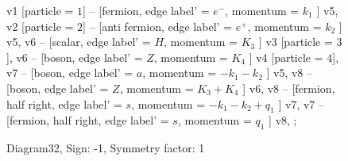 \documentclass{revtex4}
\begin{document}
\begin{figure}[!htb]
\begin{center}
{    %
v1 [particle = \(1\)] -- [fermion, edge label' = \(e^{-}\), momentum = \(k_{1}\) ] v5, 
v2 [particle = \(2\)] -- [anti fermion, edge label' = \(e^{+}\), momentum = \(k_{2}\) ] v5, 
v6 -- [scalar, edge label' = \(H\), momentum = \(K_{3}\) ] v3 [particle = \(3\)], 
v6 -- [boson, edge label' = \(Z\), momentum = \(K_{4}\) ] v4 [particle = \(4\)], 
v7 -- [boson, edge label' = \(a\), momentum = \(-k_{1} - k_{2}\) ] v5, 
v8 -- [boson, edge label' = \(Z\), momentum = \(K_{3} + K_{4}\) ] v6, 
v8 -- [fermion, half right, edge label' = \(s\), momentum = \(-k_{1} - k_{2} + q_{1}\) ] v7, 
v7 -- [fermion, half right, edge label' = \(s\), momentum = \(q_{1}\) ] v8, 
};
\end{center}
\caption{Diagram32, Sign: -1, Symmetry factor: 1}
\end{figure}
\newpage
\end{document}
